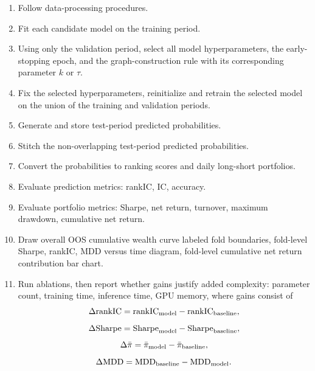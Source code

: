 \documentclass[11pt]{article}
\begin{document}
\begin{enumerate}[label=\arabic*.]
    \item Follow data-processing procedures.
    \item Fit each candidate model on the training period.
    \item Using only the validation period, select all model hyperparameters, the early-stopping epoch, and the graph-construction rule with its corresponding parameter $k$ or $\tau$.
    \item Fix the selected hyperparameters, reinitialize and retrain the selected model on the union of the training and validation periods.
    \item Generate and store test-period predicted probabilities.
    \item Stitch the non-overlapping test-period predicted probabilities.
    \item Convert the probabilities to ranking scores and daily long-short portfolios.
    \item Evaluate prediction metrics: rankIC, IC, accuracy.
    \item Evaluate portfolio metrics: Sharpe, net return, turnover, maximum drawdown, cumulative net return.
    \item Draw overall OOS cumulative wealth curve labeled fold boundaries, fold-level Sharpe, rankIC, MDD versus time diagram, fold-level cumulative net return contribution bar chart.
    \item Run ablations, then report whether gains justify added complexity: parameter count, training time, inference time, GPU memory, where gains consist of \[\Delta \text{rankIC} = \text{rankIC}_{\text{model}} - \text{rankIC}_{\text{baseline}},\] \[\Delta \text{Sharpe} = \text{Sharpe}_{\text{model}} - \text{Sharpe}_{\text{baseline}},\] \[\Delta \bar \pi = \bar \pi_{\text{model}} - \bar \pi_{\text{baseline}},\] \[\Delta \text{MDD} = \text{MDD}_{\text{baseline}} - \text{MDD}_{\text{model}}.\]
\end{enumerate}
\end{document}
